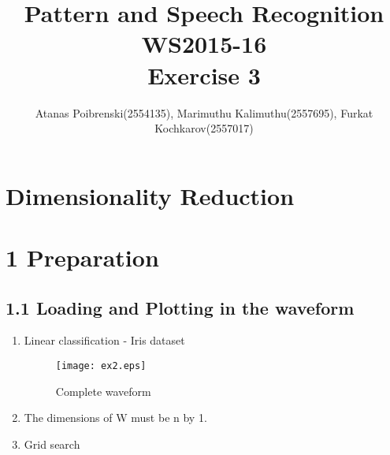 \documentclass[a4paper]{article}
\title{Pattern and Speech Recognition WS2015-16 \\ Exercise 3}
\author{Atanas Poibrenski(2554135), Marimuthu Kalimuthu(2557695), Furkat Kochkarov(2557017)}
\begin{document}
\maketitle
\section*{Dimensionality Reduction}

\section*{1 Preparation}
\subsection*{1.1 Loading and Plotting in the waveform}
\begin{enumerate}
	\item Linear classification - Iris dataset
	\begin{figure}[H]
		\begin{center}
			\texttt{[image: ex2.eps]}
			\caption{Complete waveform}\label{fig:comwavform}		
		\end{center}
	\end{figure}
	
	\item The dimensions of W must be n by 1.

\item Grid search

\end{enumerate}


%


\end{document}
